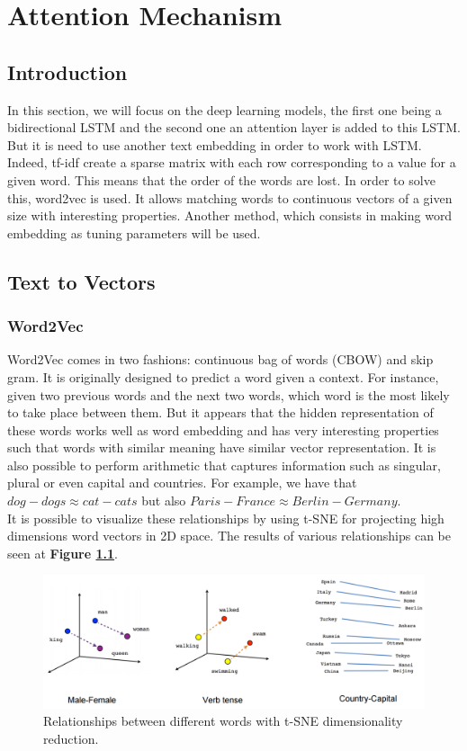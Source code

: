 ﻿\chapter{Attention Mechanism}
\section{Introduction}
In this section, we will focus on the deep learning models, the first one being a bidirectional LSTM and the second one an attention layer is added to this LSTM. But it is need to use another text embedding in order to work with LSTM. Indeed, tf-idf create a sparse matrix with each row corresponding to a value for a given word. This means that the order of the words are lost. In order to solve this, word2vec\cite{Mikolov2013} is used. It allows matching words to continuous vectors of a given size with interesting properties. Another method, which consists in making word embedding as tuning parameters will be used.
\section{Text to Vectors}
\subsection{Word2Vec}
Word2Vec comes in two fashions: continuous bag of words (CBOW) and skip gram. It is originally designed to predict a word given a context. For instance, given two previous words and the next two words, which word is the most likely to take place between them. But it appears that the hidden representation of these words works well as word embedding and has very interesting properties such that words with similar meaning have similar vector representation. It is also possible to perform arithmetic that captures information such as singular, plural or even capital and countries. For example, we have that $dog - dogs \approx cat - cats$ but also $Paris - France \approx Berlin - Germany$. \\

It is possible to visualize these relationships by using t-SNE for projecting high dimensions word vectors in 2D space. The results of various relationships can be seen at \textbf{Figure \ref{fig:chap4:word2vec}}.
\begin{figure}
 \centering
 \includegraphics[width=\textwidth]{images/chapitre4/linear-relationships}
 \caption{Relationships between different words with t-SNE dimensionality reduction. }
 \label{fig:chap4:word2vec}
\end{figure}
